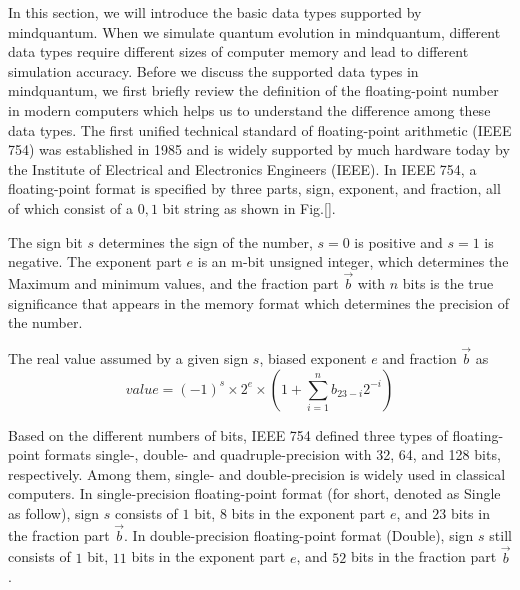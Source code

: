 
In this section, we will introduce the basic data types supported by mindquantum. When we simulate quantum evolution in mindquantum, different data types require different sizes of computer memory and lead to different simulation accuracy.
Before we discuss the supported data types in mindquantum, we first briefly review the definition of the floating-point number in modern computers which helps us to understand the difference among these data types.
The first unified technical standard of floating-point arithmetic (IEEE 754) was established in 1985 and is widely supported by much hardware today by the Institute of Electrical and Electronics Engineers (IEEE).
In IEEE 754, a floating-point format is specified by three parts, sign, exponent, and fraction, all of which consist of a ${0,1}$ bit string as shown in Fig.\ref{}.

The sign bit $s$ determines the sign of the number, $s=0$ is positive and $s=1$ is negative.
The exponent part $e$ is an m-bit unsigned integer, which determines the Maximum and minimum values, and the fraction part $\vec{b}$ with $n$ bits is the true significance that appears in the memory format which determines the precision of the number.

The real value assumed by a given sign $s$, biased exponent $e$ and fraction $\vec{b}$ as
\begin{equation}
    value = (-1)^{s}\times 2^{e}\times (1+\sum_{i=1}^nb_{23-i}2^{-i})
\end{equation}

Based on the different numbers of bits, IEEE 754 defined three types of floating-point formats single-, double- and quadruple-precision with 32, 64, and 128 bits, respectively.
Among them, single- and double-precision is widely used in classical computers.
In single-precision floating-point format (for short, denoted as Single as follow), sign $s$ consists of $1$ bit, $8$ bits in the exponent part $e$, and $23$ bits in the fraction part $\vec{b}$.
In double-precision floating-point format (Double), sign $s$ still consists of $1$ bit, $11$ bits in the exponent part $e$, and $52$ bits in the fraction part $\vec{b}$.


